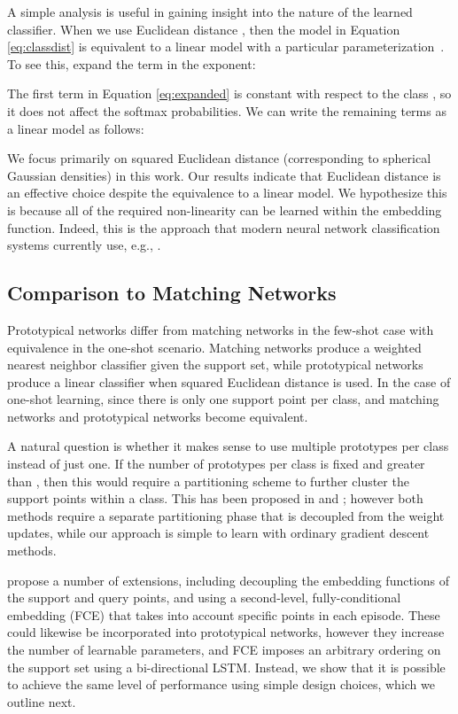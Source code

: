 \documentclass{article}
\begin{document}
A simple analysis is useful in gaining insight into the nature of the learned classifier.
When we use Euclidean distance , then the model in Equation \eqref{eq:classdist} is equivalent to a linear model with a particular parameterization~\cite{mensink2013distance}. To see this, expand the term in the exponent:

The first term in Equation \eqref{eq:expanded} is constant with respect to the class , so it does not affect the softmax probabilities. We can write the remaining terms as a linear model as follows:

We focus primarily on squared Euclidean distance (corresponding to spherical Gaussian densities) in this work. Our results indicate that Euclidean distance is an effective choice despite the equivalence to a linear model. We hypothesize this is because all of the required non-linearity can be learned within the embedding function.
Indeed, this is the approach that modern neural network classification systems currently use, e.g., \citep{krizhevsky2012imagenet, szegedy2015going}.


\subsection{Comparison to Matching Networks}
\label{sec:matchingcomparison}

Prototypical networks differ from matching networks in the few-shot case with equivalence in the one-shot scenario. Matching networks \cite{vinyals2016matching} produce a weighted nearest neighbor classifier given the support set, while prototypical networks produce a linear classifier when squared Euclidean distance is used. In the case of one-shot learning,  since there is only one support point per class, and matching networks and prototypical networks become equivalent.

A natural question is whether it makes sense to use multiple prototypes per class instead of just one.
If the number of prototypes per class is fixed and greater than , then this would require a partitioning scheme to further cluster the support points within a class. This has been proposed in \citet{mensink2013distance} and \citet{rippel2015metric}; however both methods require a separate partitioning phase that is decoupled from the weight updates, while our approach is simple to learn with ordinary gradient descent methods.

\citet{vinyals2016matching} propose a number of extensions, including decoupling the embedding functions of the support and query points, and using a second-level, fully-conditional embedding (FCE) that takes into account specific points in each episode. These could likewise be incorporated into prototypical networks, however they increase the number of learnable parameters, and FCE imposes an arbitrary ordering on the support set using a bi-directional LSTM. Instead, we show that it is possible to achieve the same level of performance using simple design choices, which we outline next.
\end{document}
